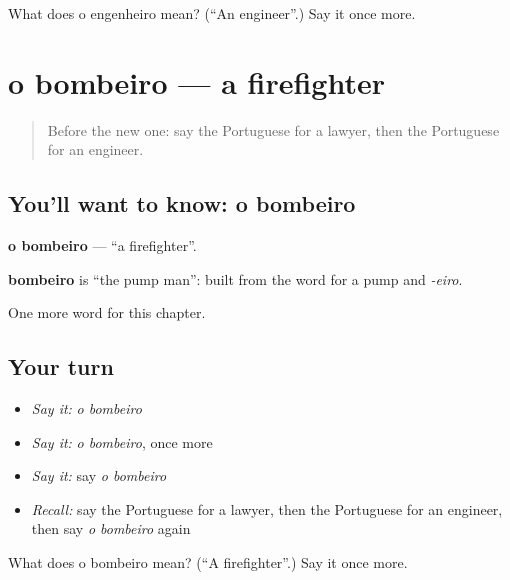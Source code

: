 \begin{tcolorbox}[breakable,colback=teal!4,colframe=teal!35!black,title={Before you move on}]
What does o engenheiro mean? (\textquotedblleft{}An engineer\textquotedblright{}.) Say it once more.
\end{tcolorbox}
\section[o bombeiro]{o bombeiro — a firefighter}

\label{lesson:PT-C111-bombeiro}



\begin{quote}
Before the new one: say the Portuguese for a lawyer, then the Portuguese for an engineer.
\end{quote}

\subsection*{You'll want to know: o bombeiro}
\textbf{o bombeiro} — \textquotedblleft{}a firefighter\textquotedblright{}.

\begin{cousinweb}
\textbf{bombeiro} is \textquotedblleft{}the pump man\textquotedblright{}: built from the word for a pump and \emph{-eiro}.
\end{cousinweb}

\begin{grammarlens}[title={What you've built}]
One more word for this chapter.
\end{grammarlens}

\subsection*{Your turn}
\begin{itemize}
\raggedright
  \item \emph{Say it:} \emph{o bombeiro}
  \item \emph{Say it:} \emph{o bombeiro}, once more
  \item \emph{Say it:} say \emph{o bombeiro}
  \item \emph{Recall:} say the Portuguese for a lawyer, then the Portuguese for an engineer, then say \emph{o bombeiro} again
\end{itemize}

\begin{tcolorbox}[breakable,colback=teal!4,colframe=teal!35!black,title={Before you move on}]
What does o bombeiro mean? (\textquotedblleft{}A firefighter\textquotedblright{}.) Say it once more.
\end{tcolorbox}
